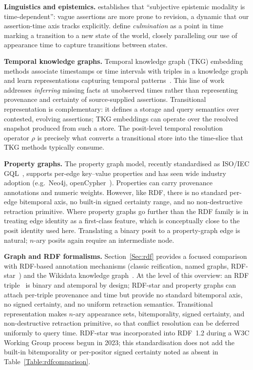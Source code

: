 \documentclass[a4paper,fleqn]{cas-sc}
\begin{document}
\textbf{Linguistics and epistemics.}
\cite{Papafragou} establishes that ``subjective epistemic modality is time-dependent'': vague assertions are more prone to revision, a dynamic that our assertion-time axis tracks explicitly. \cite{MoensSteedman} define \emph{culmination} as a point in time marking a transition to a new state of the world, closely paralleling our use of appearance time to capture transitions between states.

\textbf{Temporal knowledge graphs.}
Temporal knowledge graph (TKG) embedding methods associate timestamps or time intervals with triples in a knowledge graph and learn representations capturing temporal patterns~\cite{Lacroix2020}. This line of work addresses \emph{inferring} missing facts at unobserved times rather than representing provenance and certainty of source-supplied assertions. Transitional representation is complementary: it defines a storage and query semantics over contested, evolving assertions; TKG embeddings can operate over the resolved snapshot produced from such a store. The posit-level temporal resolution operator $\rho$ is precisely what converts a transitional store into the time-slice that TKG methods typically consume.

\textbf{Property graphs.}
The property graph model, recently standardised as ISO/IEC GQL~\cite{GQL}, supports per-edge key--value properties and has seen wide industry adoption (e.g.\ Neo4j, openCypher~\cite{Francis}). Properties can carry provenance annotations and numeric weights. However, like RDF, there is no standard per-edge bitemporal axis, no built-in signed certainty range, and no non-destructive retraction primitive. Where property graphs go further than the RDF family is in treating edge identity as a first-class feature, which is conceptually close to the posit identity used here. Translating a binary posit to a property-graph edge is natural; $n$-ary posits again require an intermediate node.

\textbf{Graph and RDF formalisms.} Section~\ref{Sec:rdf} provides a focused comparison with RDF-based annotation mechanisms (classic reification, named graphs, RDF-star~\cite{HartigChampin}) and the Wikidata knowledge graph~\cite{VrandecicKrotzsch}. At the level of this overview: an RDF triple~\cite{RDF} is binary and atemporal by design; RDF-star and property graphs can attach per-triple provenance and time but provide no standard bitemporal axis, no signed certainty, and no uniform retraction semantics. Transitional representation makes $n$-ary appearance sets, bitemporality, signed certainty, and non-destructive retraction primitive, so that conflict resolution can be deferred uniformly to query time. RDF-star was incorporated into RDF~1.2 during a W3C Working Group process begun in 2023; this standardisation does not add the built-in bitemporality or per-positor signed certainty noted as absent in Table~\ref{Table:rdfcomparison}.
\end{document}
